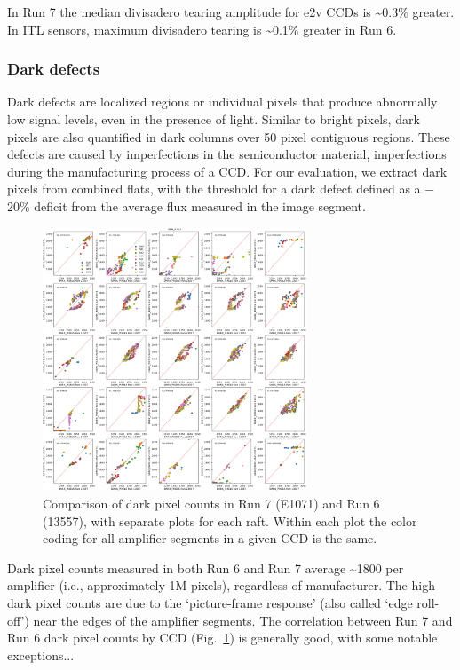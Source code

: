 In Run 7 the median divisadero tearing amplitude for e2v CCDs is \textasciitilde0.3\% greater. In ITL sensors, maximum divisadero tearing is \textasciitilde0.1\% greater in Run 6.

\subsubsection{Dark defects}\label{dark-defects}

Dark defects are localized regions or individual pixels that produce abnormally low signal levels, even in the presence of light. Similar to bright pixels, dark pixels are also quantified in dark columns over 50 pixel contiguous regions. These
defects are caused by imperfections in the semiconductor
material, imperfections during the manufacturing process of a CCD. For our evaluation, we extract
dark pixels from combined flats, with the threshold for a dark defect
defined as a $-$20\% deficit from the average flux measured in the image segment.

\begin{figure}[H]
\begin{centering}
\includegraphics[width=0.7\textwidth]{figures/baselineCharacterization/13557_E1071_DARK_PIXELS.png}
\caption{Comparison of dark pixel counts in Run 7 (E1071) and Run 6 (13557), with separate plots for each raft.  Within each plot the color coding for all amplifier segments in a given CCD is the same.}
\label{fig:dark-pixels}
\end{centering}
\end{figure}

Dark pixel counts measured in both Run 6 and Run 7 average
\textasciitilde1800 per amplifier (i.e., approximately 1M pixels), regardless of manufacturer. The
high dark pixel counts are due to the `picture-frame response' (also called `edge roll-off') 
near the edges of the amplifier segments.  The correlation between Run 7 and Run 6 dark pixel counts by CCD (Fig.~\ref{fig:dark-pixels}) is generally good, with some notable exceptions...

